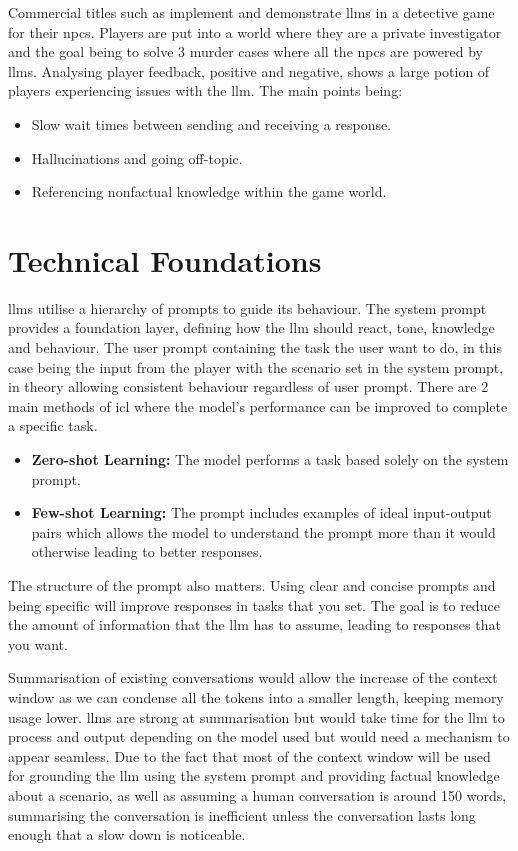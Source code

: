 \documentclass[12pt, a4paper]{report}
\begin{document}
	Commercial titles such as \cite{steampoweredVaudevilleSteam} implement and demonstrate \gls{llm}s in a detective game for their \gls{npc}s. Players are put into a world where they are a private investigator and the goal being to solve 3 murder cases where all the \gls{npc}s are powered by \gls{llm}s. Analysing player feedback, positive and negative, shows a large potion of players experiencing issues with the \gls{llm}. The main points being:
	
	\begin{itemize}
		\item Slow wait times between sending and receiving a response.
		\item Hallucinations and going off-topic.
		\item Referencing nonfactual knowledge within the game world.
	\end{itemize}
	
	\section{Technical Foundations}
	\label{section:technicalfoundations}
	\gls{llm}s utilise a hierarchy of prompts to guide its behaviour. The system prompt provides a foundation layer, defining how the \gls{llm} should react, tone, knowledge and behaviour. The user prompt containing the task the user want to do, in this case being the input from the player with the scenario set in the system prompt, in theory allowing consistent behaviour regardless of user prompt. There are 2 main methods of \gls{icl} where the model's performance can be improved to complete a specific task.
	
	\begin{itemize}
		\item \textbf{Zero-shot Learning:} The model performs a task based solely on the system prompt.
		\item \textbf{Few-shot Learning:} The prompt includes examples of ideal input-output pairs which allows the model to understand the prompt more than it would otherwise leading to better responses.
	\end{itemize}
	
	The structure of the prompt also matters. Using clear and concise prompts and being specific will improve responses in tasks that you set. The goal is to reduce the amount of information that the \gls{llm} has to assume, leading to responses that you want.
	
	Summarisation of existing conversations would allow the increase of the context window as we can condense all the tokens into a smaller length, keeping memory usage lower. \gls{llm}s are strong at summarisation but would take time for the \gls{llm} to process and output depending on the model used but would need a mechanism to appear seamless. Due to the fact that most of the context window will be used for grounding the \gls{llm} using the system prompt and providing factual knowledge about a scenario, as well as assuming a human conversation is around 150 words, summarising the conversation is inefficient unless the conversation lasts long enough that a slow down is noticeable.
	
\end{document}
